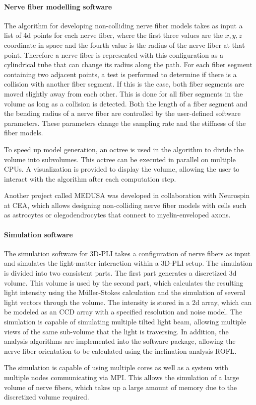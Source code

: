 \paragraph{Nerve fiber modelling software}
% 
The algorithm for developing non-colliding nerve fiber models takes as input a list of 4d points for each nerve fiber, where the first three values are the $x,y,z$ coordinate in space and the fourth value is the radius of the nerve fiber at that point.
Therefore a nerve fiber is represented with this configuration as a cylindrical tube that can change its radius along the path.
For each fiber segment containing two adjacent points, a test is performed to determine if there is a collision with another fiber segment.
If this is the case, both fiber segments are moved slightly away from each other.
This is done for all fiber segments in the volume as long as a collision is detected.
Both the length of a fiber segment and the bending radius of a nerve fiber are controlled by the user-defined software parameters.
These parameters change the sampling rate and the stiffness of the fiber models.
\par
% 
To speed up model generation, an octree is used in the algorithm to divide the volume into subvolumes.
This octree can be executed in parallel on multiple \acp{CPU}.
A visualization is provided to display the volume, allowing the user to interact with the algorithm after each computation step.
\par
% 
Another project called \ac{MEDUSA} was developed in collaboration with Neurospin at \ac{CEA}, which allows designing non-colliding nerve fiber models with cells such as astrocytes or olegodendrocytes that connect to myelin-enveloped axons.
% 
% 
% 
\paragraph{Simulation software}
% 
The simulation software for \ac{3D-PLI} takes a configuration of nerve fibers as input and simulates the light-matter interaction within a \ac{3D-PLI} setup.
The simulation is divided into two consistent parts.
The first part generates a discretized 3d volume.
This volume is used by the second part, which calculates the resulting light intensity using the M\"{u}ller-Stokes calculation and the simulation of several light vectors through the volume.
The intensity is stored in a 2d array, which can be modeled as an \ac{CCD} array with a specified resolution and noise model.
The simulation is capable of simulating multiple tilted light beam, allowing multiple views of the same sub-volume that the light is traversing.
In addition, the analysis algorithms are implemented into the software package, allowing the nerve fiber orientation to be calculated using the inclination analysis \ac{ROFL}.
\par
% 
The simulation is capable of using multiple cores as well as a system with multiple nodes communicating via \ac{MPI}.
This allows the simulation of a large volume of nerve fibers, which takes up a large amount of memory due to the discretized volume required.
% 
% 
% 
